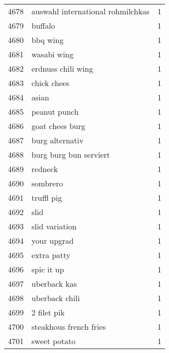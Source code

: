 \begin{tabular}{llr}
4678 &                  auswahl international rohmilchkas &      1 \\
4679 &                                            buffalo &      1 \\
4680 &                                           bbq wing &      1 \\
4681 &                                        wasabi wing &      1 \\
4682 &                                 erdnuss chili wing &      1 \\
4683 &                                        chick chees &      1 \\
4684 &                                              asian &      1 \\
4685 &                                       peanut punch &      1 \\
4686 &                                    goat chees burg &      1 \\
4687 &                                    burg alternativ &      1 \\
4688 &                             burg burg bun serviert &      1 \\
4689 &                                            redneck &      1 \\
4690 &                                           sombrero &      1 \\
4691 &                                         truffl pig &      1 \\
4692 &                                               slid &      1 \\
4693 &                                     slid variation &      1 \\
4694 &                                        your upgrad &      1 \\
4695 &                                        extra patty &      1 \\
4696 &                                         spic it up &      1 \\
4697 &                                       uberback kas &      1 \\
4698 &                                     uberback chili &      1 \\
4699 &                                        2 filet pik &      1 \\
4700 &                             steakhous french fries &      1 \\
4701 &                                       sweet potato &      1 \\

\end{tabular}
